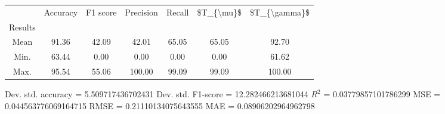 \begin{tabular}{|c|c|c|c|c|c|c|}
\toprule
{} &  Accuracy &  F1 score &  Precision &  Recall &  \$T\_\{\textbackslash mu\}\$ &  \$T\_\{\textbackslash gamma\}\$ \\
Results &           &           &            &         &            &               \\
\hline
Mean    &     91.36 &     42.09 &      42.01 &   65.05 &      65.05 &         92.70 \\
Min.    &     63.44 &      0.00 &       0.00 &    0.00 &       0.00 &         61.62 \\
Max.    &     95.54 &     55.06 &     100.00 &   99.09 &      99.09 &        100.00 \\
\bottomrule
\end{tabular}

 Dev. std. accuracy = 5.509717436702431
 Dev. std. F1-score = 12.282466213681044
 $R^2$ = 0.03779857101786299
 MSE = 0.044563776069164715
 RMSE = 0.21110134075643555
 MAE = 0.08906202964962798